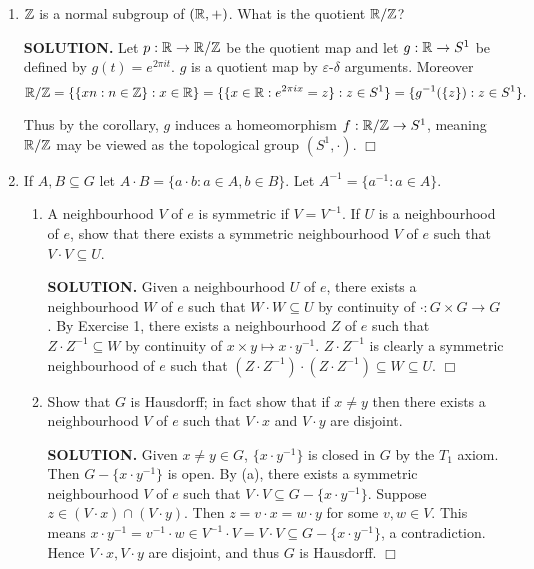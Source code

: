 \documentclass{article}
\begin{document}
\begin{enumerate}
    \item $\mathbb{Z}$ is a normal subgroup of $(\mathbb{R}, +)$. What is the quotient $\mathbb{R} / \mathbb{Z}$?

    {\bf SOLUTION.} Let $p: \mathbb{R} \rightarrow \mathbb{R} / \mathbb{Z}$ be the quotient map and let $g: \mathbb{R} \rightarrow S^1$ be defined by $g(t) = e^{2\pi i t}$. $g$ is a quotient map by $\varepsilon$-$\delta$ arguments. Moreover 
    $$\mathbb{R} / \mathbb{Z} = \{\{xn : n \in \mathbb{Z}\}: x \in \mathbb{R}\} = \{\{x \in \mathbb{R}: e^{2\pi i x} = z\}: z \in S^1 \} = \{g^{-1}(\{z\}): z \in S^1\}.$$
    
    Thus by the corollary, $g$ induces a homeomorphism $f: \mathbb{R} / \mathbb{Z} \rightarrow S^1$, meaning $\mathbb{R} / \mathbb{Z}$ may be viewed as the topological group $(S^1, \cdot)$. $\Box$

    \item If $A, B \subseteq G$ let $A \cdot B = \{a \cdot b: a \in A, b \in B\}$. Let $A^{-1} = \{a^{-1}: a \in A\}$.
    \begin{enumerate}
        \item A neighbourhood $V$ of $e$ is symmetric if $V = V^{-1}$. If $U$ is a neighbourhood of $e$, show that there exists a symmetric neighbourhood $V$ of $e$ such that $V \cdot V \subseteq U$.

        {\bf SOLUTION.} Given a neighbourhood $U$ of $e$, there exists a neighbourhood $W$ of $e$ such that $W \cdot W \subseteq U$ by continuity of $\cdot: G \times G \rightarrow G$. By Exercise 1, there exists a neighbourhood $Z$ of $e$ such that $Z \cdot Z^{-1} \subseteq W$ by continuity of $x \times y \mapsto x\cdot y^{-1}$. $Z \cdot Z^{-1}$ is clearly a symmetric neighbourhood of $e$ such that $(Z \cdot Z^{-1}) \cdot (Z \cdot Z^{-1}) \subseteq W \subseteq U$. $\Box$

        \item Show that $G$ is Hausdorff; in fact show that if $x \neq y$ then there exists a neighbourhood $V$ of $e$ such that $V \cdot x$ and $V \cdot y$ are disjoint.

        {\bf SOLUTION.} Given $x\neq y \in G$, $\{x \cdot y^{-1}\}$ is closed in $G$ by the $T_1$ axiom. Then $G - \{x \cdot y^{-1}\}$ is open. By (a), there exists a symmetric neighbourhood $V$ of $e$ such that $V\cdot V \subseteq G - \{x \cdot y^{-1}\}$. Suppose $z \in (V \cdot x) \cap (V \cdot y)$. Then $z = v \cdot x = w \cdot y$ for some $v, w \in V$. This means $x \cdot y^{-1} = v^{-1} \cdot w \in V^{-1} \cdot V = V \cdot V \subseteq G - \{x \cdot y^{-1}\}$, a contradiction. Hence $V \cdot x, V \cdot y$ are disjoint, and thus $G$ is Hausdorff. $\Box$


\end{enumerate}
\end{enumerate}
\end{document}
